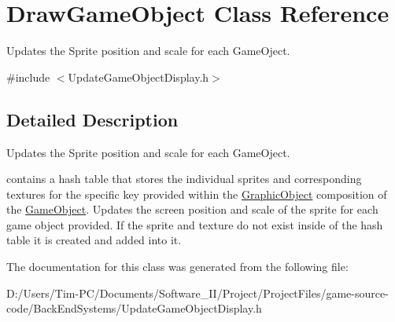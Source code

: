 \hypertarget{class_draw_game_object}{}\section{Draw\+Game\+Object Class Reference}
\label{class_draw_game_object}


Updates the Sprite position and scale for each Game\+Oject.  




{\ttfamily \#include $<$Update\+Game\+Object\+Display.\+h$>$}



\subsection{Detailed Description}
Updates the Sprite position and scale for each Game\+Oject. 

contains a hash table that stores the individual sprites and corresponding textures for the specific key provided within the \hyperlink{class_graphic_object}{Graphic\+Object} composition of the \hyperlink{class_game_object}{Game\+Object}. Updates the screen position and scale of the sprite for each game object provided. If the sprite and texture do not exist inside of the hash table it is created and added into it. 

The documentation for this class was generated from the following file\+:\begin{DoxyCompactItemize}
\item 
D\+:/\+Users/\+Tim-\/\+P\+C/\+Documents/\+Software\+\_\+\+I\+I/\+Project/\+Project\+Files/game-\/source-\/code/\+Back\+End\+Systems/Update\+Game\+Object\+Display.\+h\end{DoxyCompactItemize}
